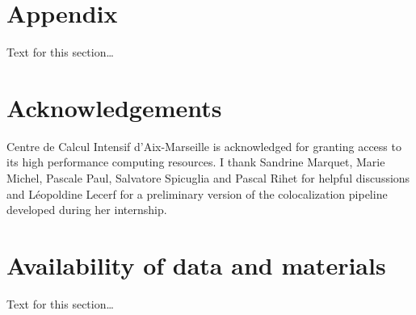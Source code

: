 \documentclass{bmcart}
\begin{document}

    
    
    
    
%  


    \section*{Appendix}
    Text for this section\ldots


    \begin{backmatter}

        \section*{Acknowledgements}%
        Centre de Calcul Intensif d'Aix-Marseille is acknowledged for granting access to its high performance computing resources.
%
        I thank Sandrine Marquet, Marie Michel, Pascale Paul, Salvatore Spicuglia and Pascal Rihet for helpful discussions and Léopoldine Lecerf for a preliminary version of the colocalization pipeline developed during her internship.



        \section*{Availability of data and materials}%
        Text for this section\ldots



\end{backmatter}
\end{document}
